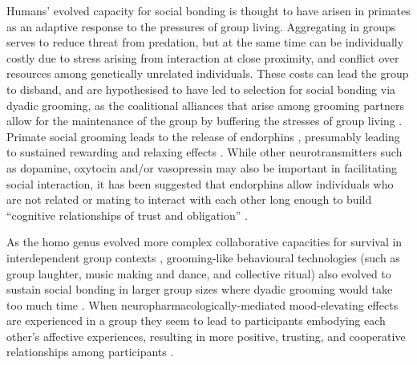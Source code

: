 \begin{CJK}{UTF8}{gbsn}

Humans' evolved capacity for social bonding is thought to have arisen in primates as an adaptive response to the pressures of group living.  Aggregating in groups serves to reduce threat from predation, but at the same time can be individually costly due to stress arising from interaction at close proximity, and conflict over resources among genetically unrelated individuals.  These costs can lead the group to disband, and are hypothesised to have led to selection for social bonding via dyadic grooming, as the coalitional alliances that arise among grooming partners allow for the maintenance of the group by buffering the stresses of group living \citep{Dunbar2012}.  Primate social grooming leads to the release of endorphins \citep[a type of endogenous opioid, see][]{Keverne1989}, presumably leading to sustained rewarding and relaxing effects \citep{Dunbar2010}.  While other neurotransmitters such as dopamine, oxytocin and/or vasopressin may also be important in facilitating social interaction, it has been suggested that endorphins allow individuals who are not related or mating to interact with each other long enough to build ``cognitive relationships of trust and obligation'' \citep[1839]{Dunbar2012}.

As the homo genus evolved more complex collaborative capacities for survival in interdependent group contexts \citep[see][]{Dunbar1998,Tomasello2012a}, grooming-like behavioural technologies (such as group laughter, music making and dance, and collective ritual) also evolved \citep[via processes of multi-level cultural group selection, cf.][]{Wilson2008} to sustain social bonding in larger group sizes where dyadic grooming would take too much time \citep{Dunbar2012,Tarr2014,Launay2016}. When neuropharmacologically-mediated mood-elevating effects are experienced in a group they seem to lead to participants embodying each other’s affective experiences, resulting in more positive, trusting, and cooperative relationships among participants \citep{Dunbar2012}.


\end{CJK}
